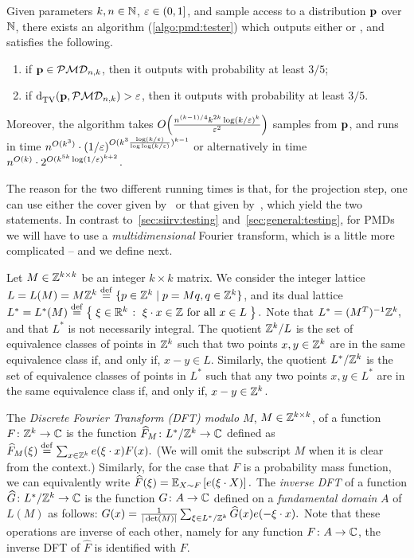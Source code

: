 \begin{theorem}
    Given parameters $k,n\in\N$, $\eps\in(0,1]$, and sample access to a distribution $\p$ over $\N$, there exists an algorithm (\cref{algo:pmd:tester}) which outputs either \accept or \reject, and satisfies the following.
    \begin{enumerate}
        \item if $\p \in \classpmd[n]{k}$, then it outputs \accept with probability at least $3/5$;
        \item if $\totalvardist{\p}{\classpmd[n]{k}} > \eps$, then it outputs \reject with probability at least $3/5$.
    \end{enumerate}
    Moreover, the algorithm takes $\bigO{\frac{n^{(k-1)/4} k^{2k} \log(k/\eps)^k}{\eps^2}}$ samples from $\p$, and runs in time $n^{O(k^3)} \cdot (1/\eps)^{O(k^3\frac{\log(k/\eps)}{\log\log(k/\eps)})^{k-1}}$ or alternatively in time $n^{O(k)} \cdot  2^{O(k^{5k} \log(1/\eps)^{k+2}}$.
\end{theorem}
The reason for the two different running times is that, for the projection step, one can use either the cover given by~\cite{DKS:15b} or that given by~\cite{DDKT:16}, which yield the two statements.
In contrast to~\cref{sec:siirv:testing} and~\cref{sec:general:testing}, for PMDs we will have to use a \emph{multidimensional} Fourier transform, which is a little more complicated -- and we define next.


Let $M \in \Z^{k \times k}$ be an integer $k \times k$ matrix.
We consider the integer lattice
$L  = L(M) =  M \Z^k \eqdef \{ p \in \Z^k \mid p = M q,  q \in \Z^k \}$, and its dual lattice
 $L^{\ast} = L^{\ast}(M)   \eqdef \setOfSuchThat{ \xi \in \R^k }{ \xi \cdot x \in \Z \textrm{ for all } x \in L }.$
 Note that  $L^{\ast} = (M^T)^{-1} \Z^k,$ and that $L^{\ast}$ is not necessarily integral.
The quotient $ \Z^k \slash L$ is the set of equivalence classes of points in $\Z^k$ such that two points $x, y \in \Z^k$
are in the same equivalence class if, and only if, $x - y \in L$.
Similarly, the quotient $L^{\ast} \slash \Z^k$ is the set of equivalence
classes of points in $L^{\ast}$ such that any two points $x, y \in L^{\ast}$ are in the same equivalence class if, and only if, $x -y \in \Z^k$.

The \emph{Discrete Fourier Transform (DFT) modulo $M$}, $M \in \Z^{k \times k}$, of a function
$F\colon \Z^k \to \C$ is  the function $\widehat{F}_M\colon L^{\ast} \slash \Z^k  \to \C$
defined as $\widehat{F}_M(\xi)\eqdef\sum_{x \in  \Z^k} e(\xi \cdot x) F(x).$ 
(We will omit the subscript $M$ when it is clear from the context.)
Similarly, for the case that $F$ is a probability mass function, we can equivalently write
$\widehat{F}(\xi)= \shortexpect_{X \sim F} \left[ e(\xi \cdot X) \right].$ The \emph{inverse DFT} of a function $\widehat{G}\colon L^{\ast} \slash \Z^k  \to \C$
is the function $G\colon A \to \C$ defined on a \emph{fundamental domain} $A$ of $L(M)$ as follows:
$G(x) = \frac{1}{|\det(M)|} \sum_{\xi \in L^{\ast} \slash \Z^k} \widehat{G}(x) e(- \xi \cdot x).$
Note that these operations are inverse of each other,
namely for any function $F\colon A \to \C$, the inverse DFT of $\widehat{F}$ is identified with  $F$.


